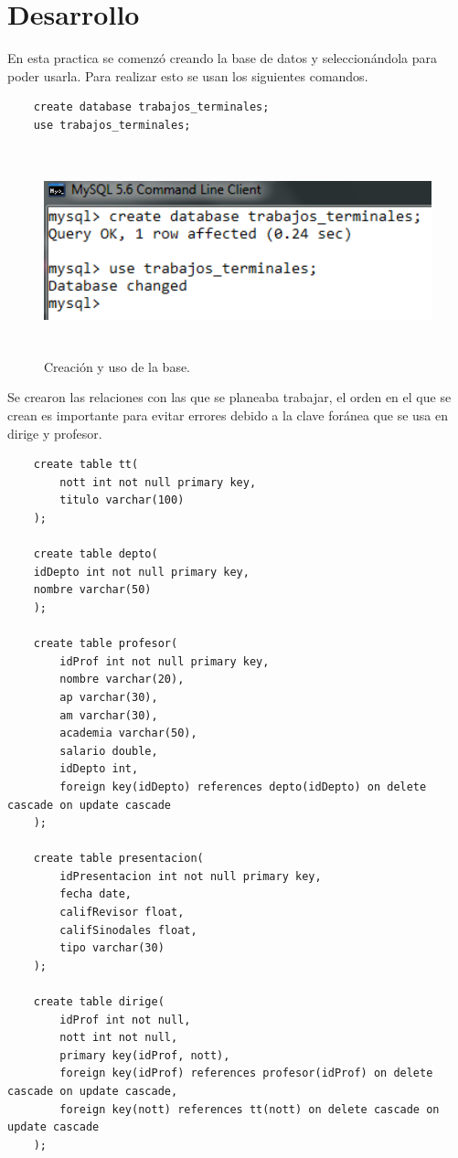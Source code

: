 \documentclass[12pt, titlepage]{article}
\begin{document}
    \section{Desarrollo}
    En esta practica se comenzó creando la base de datos y seleccionándola para poder usarla. Para realizar esto se usan los siguientes comandos.
    \begin{lstlisting}
    create database trabajos_terminales;
    use trabajos_terminales;
    \end{lstlisting}
    \begin{figure}[H]
        \begin{center}
            \includegraphics[width=14cm, height=6cm]{img/create.png}
            \caption{Creación y uso de la base.}
            \label{fig:create}
        \end{center}
    \end{figure}
    Se crearon las relaciones con las que se planeaba trabajar, el orden en el que se crean es importante para evitar errores debido a la clave foránea que se usa en dirige y profesor.
    \begin{lstlisting}
    create table tt(
        nott int not null primary key,
        titulo varchar(100)
    );
    
    create table depto(
    idDepto int not null primary key,
    nombre varchar(50)
    );
    
    create table profesor(
        idProf int not null primary key,
        nombre varchar(20),
        ap varchar(30),
        am varchar(30),
        academia varchar(50),
        salario double,
        idDepto int,
        foreign key(idDepto) references depto(idDepto) on delete cascade on update cascade
    );
    
    create table presentacion(
        idPresentacion int not null primary key,
        fecha date,
        califRevisor float,
        califSinodales float,
        tipo varchar(30)
    );
    
    create table dirige(
        idProf int not null,
        nott int not null,
        primary key(idProf, nott),
        foreign key(idProf) references profesor(idProf) on delete cascade on update cascade,
        foreign key(nott) references tt(nott) on delete cascade on update cascade
    );
    \end{lstlisting}
\end{document}
